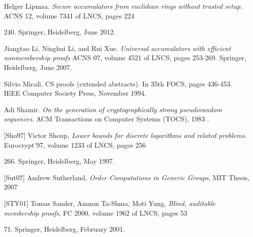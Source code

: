 \documentclass[11pt, lettersize, notitlepage, leqno, footskip=0.6cm]{article}
\newcommand{\noin}{\noindent}
\numberwithin{equation}{section}
\begin{document}

\noin [Lip12] Helger Lipmaa. \textit{Secure accumulators from euclidean rings without trusted setup.} ACNS 12, volume 7341 of LNCS, pages 224{240. Springer, Heidelberg, June 2012.\vspace{0.1cm}

\noin [LLX07] Jiangtao Li, Ninghui Li, and Rui Xue.  \textit{Universal accumulators with efficient nonmembership proofs} ACNS 07, volume 4521 of LNCS, pages 253-269. Springer, Heidelberg, June 2007.\vspace{0.1cm}


\noin [Mic94] Silvio Micali. CS proofs (extended abstracts). In 35th FOCS, pages 436-453. IEEE Computer Society Press, November 1994.\vspace{0.1cm}


\noin [Sha83] Adi Shamir. \textit{On the generation of cryptographically strong pseudorandom
sequences}. ACM Transactions on Computer Systems (TOCS), 1983 \vspace{0.1cm}.

\noin \hypertarget{Sho97}{[Sho97]} Victor Shoup, \textit{Lower bounds for discrete logarithms and related problems}. Eurocrypt'97, volume 1233 of LNCS, pages 256{266. Springer, Heidelberg, May 1997. \vspace{0.1cm}

\noin \hypertarget{Sut07}{[Sut07]} Andrew Sutherland, \textit{Order Computations in Generic Groups}, MIT Thesis, 2007 \vspace{0.1cm}

\noin \hypertarget{STY01}{[STY01]} Tomas Sander, Amnon Ta-Shma, Moti Yung, \textit{Blind, auditable membership proofs}, FC 2000, volume 1962 of LNCS, pages 53{71. Springer, Heidelberg, February 2001.\vspace{0.1cm}


}}}
\end{document}
